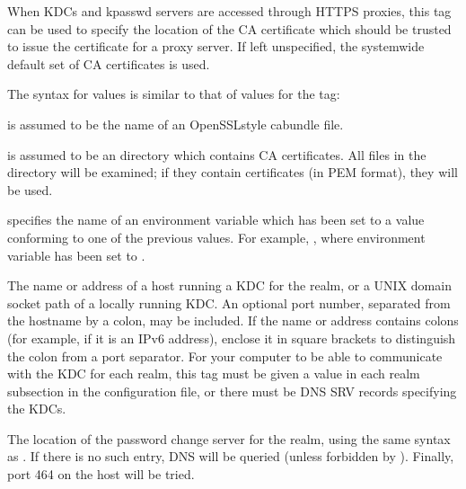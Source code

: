 \documentclass[letterpaper,10pt,english]{sphinxmanual}
\begin{document}
\begin{description}
\sphinxAtStartPar
When KDCs and kpasswd servers are accessed through HTTPS proxies, this tag
can be used to specify the location of the CA certificate which should be
trusted to issue the certificate for a proxy server.  If left unspecified,
the system\sphinxhyphen{}wide default set of CA certificates is used.

\sphinxAtStartPar
The syntax for values is similar to that of values for the
 tag:

\sphinxAtStartPar
{} 

\sphinxAtStartPar
{} is assumed to be the name of an OpenSSL\sphinxhyphen{}style ca\sphinxhyphen{}bundle file.

\sphinxAtStartPar
{} 

\sphinxAtStartPar
{} is assumed to be an directory which contains CA certificates.
All files in the directory will be examined; if they contain certificates
(in PEM format), they will be used.

\sphinxAtStartPar
{} 

\sphinxAtStartPar
{} specifies the name of an environment variable which has been set
to a value conforming to one of the previous values.  For example,
, where environment variable  has
been set to .

\sphinxAtStartPar
The name or address of a host running a KDC for the realm, or a
UNIX domain socket path of a locally running KDC.  An optional
port number, separated from the hostname by a colon, may be
included.  If the name or address contains colons (for example, if
it is an IPv6 address), enclose it in square brackets to
distinguish the colon from a port separator.  For your computer to
be able to communicate with the KDC for each realm, this tag must
be given a value in each realm subsection in the configuration
file, or there must be DNS SRV records specifying the KDCs.

\sphinxAtStartPar
The location of the password change server for the realm, using
the same syntax as .  If there is no such entry, DNS will
be queried (unless forbidden by ).  Finally,
port 464 on the  host will be tried.


\end{description}
\end{document}

